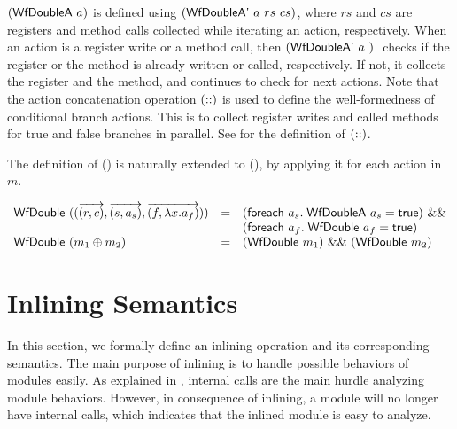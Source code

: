 $(\textsf{WfDoubleA}\ a)$ is defined using $(\textsf{WfDoubleA'}\ a\ rs\ cs)$, where
$rs$ and $cs$ are registers and method calls collected while iterating
an action, respectively. When an action is a register write or a
method call, then $(\wfdoubleap{a})$ checks if the register or the
method is already written or called, respectively. If not, it collects
the register and the method, and continues to check for next actions.
Note that the action concatenation operation $(::)$ is used
to define the well-formedness of conditional branch actions. This is
to collect register writes and called methods for true and false
branches in parallel. See  for the definition
of $(::)$.

The definition of () is naturally extended to
(), by applying it for each action in $m$.

\begin{definition}
  \label{def-wfdouble}
  \mbox{}
  \begin{center}
    \begin{math}
      \begin{array}{lcl}
        \wfdouble{(\modbasic{\regpair{r}{c}}{\rulepair{s}{a_s}}{\methodpair{f}{\lambda x.a_f}})} & =
        & (\wordforeach{} a_s.\; \wfdoublea{a_s} = \btrue)\ \band{} \\
        & & (\wordforeach{} a_f.\; \wfdouble{a_f} = \btrue) \\
        \wfdouble{(\modcomp{m_1}{m_2})} & = & (\wfdouble{m_1})\ \band{}\ (\wfdouble{m_2}) \\
      \end{array}
    \end{math}
  \end{center}
\end{definition}

\section{Inlining Semantics}
\label{sec:inlining-semantics}

In this section, we formally define an inlining operation and its
corresponding semantics. The main purpose of inlining is to handle
possible behaviors of modules easily. As explained in
, internal calls are the main hurdle
analyzing module behaviors. However, in consequence of inlining, a
module will no longer have internal calls, which indicates that the
inlined module is easy to analyze.


